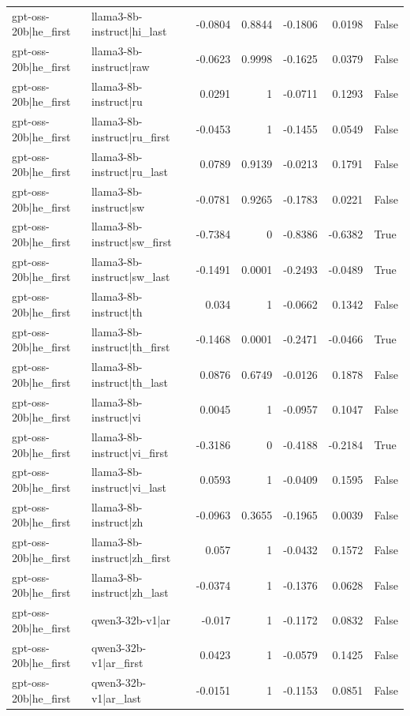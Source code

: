 \begin{table}
\begin{tabular}{l l r r r r l}
gpt-oss-20b|he_first & llama3-8b-instruct|hi_last & -0.0804 & 0.8844 & -0.1806 & 0.0198 & False \\
gpt-oss-20b|he_first & llama3-8b-instruct|raw & -0.0623 & 0.9998 & -0.1625 & 0.0379 & False \\
gpt-oss-20b|he_first & llama3-8b-instruct|ru & 0.0291 & 1 & -0.0711 & 0.1293 & False \\
gpt-oss-20b|he_first & llama3-8b-instruct|ru_first & -0.0453 & 1 & -0.1455 & 0.0549 & False \\
gpt-oss-20b|he_first & llama3-8b-instruct|ru_last & 0.0789 & 0.9139 & -0.0213 & 0.1791 & False \\
gpt-oss-20b|he_first & llama3-8b-instruct|sw & -0.0781 & 0.9265 & -0.1783 & 0.0221 & False \\
gpt-oss-20b|he_first & llama3-8b-instruct|sw_first & -0.7384 & 0 & -0.8386 & -0.6382 & True \\
gpt-oss-20b|he_first & llama3-8b-instruct|sw_last & -0.1491 & 0.0001 & -0.2493 & -0.0489 & True \\
gpt-oss-20b|he_first & llama3-8b-instruct|th & 0.034 & 1 & -0.0662 & 0.1342 & False \\
gpt-oss-20b|he_first & llama3-8b-instruct|th_first & -0.1468 & 0.0001 & -0.2471 & -0.0466 & True \\
gpt-oss-20b|he_first & llama3-8b-instruct|th_last & 0.0876 & 0.6749 & -0.0126 & 0.1878 & False \\
gpt-oss-20b|he_first & llama3-8b-instruct|vi & 0.0045 & 1 & -0.0957 & 0.1047 & False \\
gpt-oss-20b|he_first & llama3-8b-instruct|vi_first & -0.3186 & 0 & -0.4188 & -0.2184 & True \\
gpt-oss-20b|he_first & llama3-8b-instruct|vi_last & 0.0593 & 1 & -0.0409 & 0.1595 & False \\
gpt-oss-20b|he_first & llama3-8b-instruct|zh & -0.0963 & 0.3655 & -0.1965 & 0.0039 & False \\
gpt-oss-20b|he_first & llama3-8b-instruct|zh_first & 0.057 & 1 & -0.0432 & 0.1572 & False \\
gpt-oss-20b|he_first & llama3-8b-instruct|zh_last & -0.0374 & 1 & -0.1376 & 0.0628 & False \\
gpt-oss-20b|he_first & qwen3-32b-v1|ar & -0.017 & 1 & -0.1172 & 0.0832 & False \\
gpt-oss-20b|he_first & qwen3-32b-v1|ar_first & 0.0423 & 1 & -0.0579 & 0.1425 & False \\
gpt-oss-20b|he_first & qwen3-32b-v1|ar_last & -0.0151 & 1 & -0.1153 & 0.0851 & False \\

\end{tabular}
\end{table}
